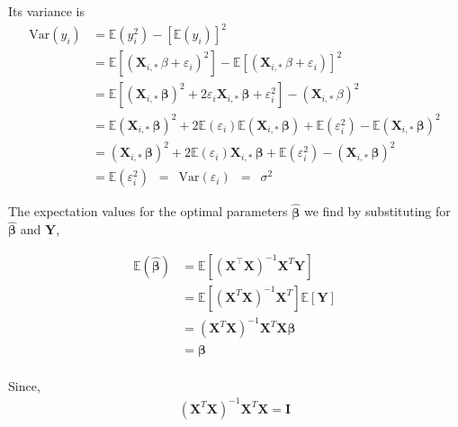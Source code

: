 \documentclass[a4paper,12pt]{article}
\begin{document}
\noindent
Its variance is
\begin{equation} \label{eq1}
\begin{split}
 \mbox{Var}(y_i) & = \mathbb{E} ( y_i^2 ) -
[\mathbb{E}(y_i)]^2  \\  & = \mathbb{E} [ ( \mathbf{X}_{i, \ast} \,
\beta + \varepsilon_i )^2] - \mathbb{E} [ ( \mathbf{X}_{i, \ast} \,
\beta + \varepsilon_i )]^2 \\ &
= \mathbb{E} [ ( \mathbf{X}_{i, \ast} \, \boldsymbol{\beta})^2 + 2 \varepsilon_i
\mathbf{X}_{i, \ast} \, \boldsymbol{\beta} + \varepsilon_i^2 ] - ( \mathbf{X}_{i,
\ast} \, \beta)^2 \\  & = \mathbb{E}( \mathbf{X}_{i, \ast} \, \boldsymbol{\beta})^2 + 2
\mathbb{E}(\varepsilon_i) \mathbb{E}(\mathbf{X}_{i, \ast} \, \boldsymbol{\beta}) +
\mathbb{E}(\varepsilon_i^2 ) - \mathbb{E}( \mathbf{X}_{i, \ast} \, \boldsymbol{\beta})^2 
\\ & = ( \mathbf{X}_{i, \ast} \, \boldsymbol{\beta})^2 + 2
\mathbb{E}(\varepsilon_i) \mathbf{X}_{i, \ast} \, \boldsymbol{\beta} +
\mathbb{E}(\varepsilon_i^2 ) - ( \mathbf{X}_{i, \ast} \, \boldsymbol{\beta})^2 
\\ & = \mathbb{E}(\varepsilon_i^2 ) \, \, \, = \, \, \,\mbox{Var}(\varepsilon_i) \, \, \, = \, \, \, \sigma^2 
\end{split}
\end{equation}

\noindent
The expectation values for the optimal parameters $\boldsymbol{\hat{\beta}}$ we find by substituting for $\boldsymbol{\hat{\beta}}$ and $\mathbf{Y}$, 

\begin{equation} \label{eq1}
\begin{split}
\mathbb{E}(\boldsymbol{\hat{\beta}}) &= \mathbb{E}[ (\mathbf{X}^{\top} \mathbf{X})^{-1}\mathbf{X}^{T} \mathbf{Y}]\\ 
& =\mathbb{E}[(\mathbf{X}^{T} \mathbf{X})^{-1}\mathbf{X}^{T}] \mathbb{E}[ \mathbf{Y}]\\
& =(\mathbf{X}^{T} \mathbf{X})^{-1} \mathbf{X}^{T}\mathbf{X}\boldsymbol{\beta}\\
&=\boldsymbol{\beta}\\
\end{split}
\end{equation}

Since,
\begin{equation} \label{eq1}
\begin{split}
(\mathbf{X}^{T} \mathbf{X})^{-1} \mathbf{X}^{T}\mathbf{X}=\mathbf{I}
\end{split}
\end{equation}
\end{document}
